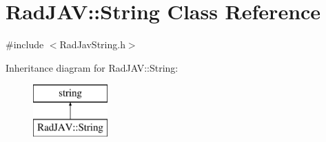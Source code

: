 \hypertarget{class_rad_j_a_v_1_1_string}{}\section{Rad\+J\+AV\+:\+:String Class Reference}
\label{class_rad_j_a_v_1_1_string}


{\ttfamily \#include $<$Rad\+Jav\+String.\+h$>$}

Inheritance diagram for Rad\+J\+AV\+:\+:String\+:\begin{figure}[H]
\begin{center}
\leavevmode
\includegraphics[height=2.000000cm]{class_rad_j_a_v_1_1_string}
\end{center}
\end{figure}

